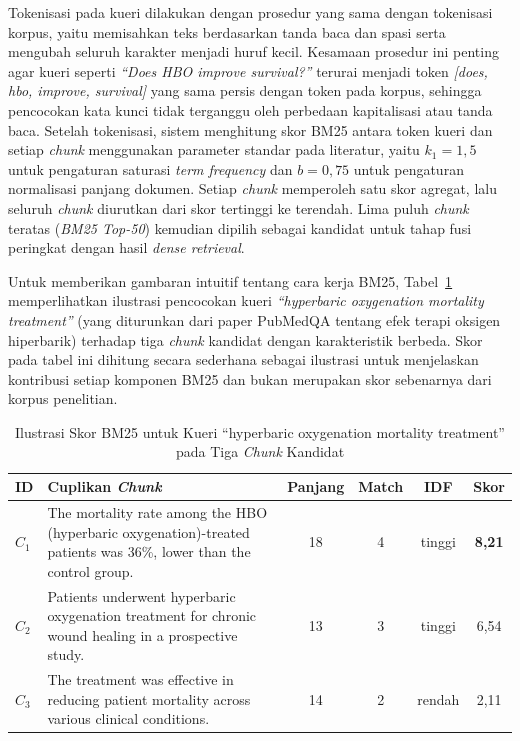 Tokenisasi pada kueri dilakukan dengan prosedur yang sama dengan tokenisasi korpus, yaitu memisahkan teks berdasarkan tanda baca dan spasi serta mengubah seluruh karakter menjadi huruf kecil. Kesamaan prosedur ini penting agar kueri seperti \textit{``Does HBO improve survival?''} terurai menjadi token \textit{[does, hbo, improve, survival]} yang sama persis dengan token pada korpus, sehingga pencocokan kata kunci tidak terganggu oleh perbedaan kapitalisasi atau tanda baca. Setelah tokenisasi, sistem menghitung skor BM25 antara token kueri dan setiap \textit{chunk} menggunakan parameter standar pada literatur, yaitu $k_1 = 1{,}5$ untuk pengaturan saturasi \textit{term frequency} dan $b = 0{,}75$ untuk pengaturan normalisasi panjang dokumen. Setiap \textit{chunk} memperoleh satu skor agregat, lalu seluruh \textit{chunk} diurutkan dari skor tertinggi ke terendah. Lima puluh \textit{chunk} teratas (\textit{BM25 Top-50}) kemudian dipilih sebagai kandidat untuk tahap fusi peringkat dengan hasil \textit{dense retrieval}.

Untuk memberikan gambaran intuitif tentang cara kerja BM25, Tabel~\ref{tbl:bm25-contoh} memperlihatkan ilustrasi pencocokan kueri \textit{``hyperbaric oxygenation mortality treatment''} (yang diturunkan dari paper PubMedQA tentang efek terapi oksigen hiperbarik) terhadap tiga \textit{chunk} kandidat dengan karakteristik berbeda. Skor pada tabel ini dihitung secara sederhana sebagai ilustrasi untuk menjelaskan kontribusi setiap komponen BM25 dan bukan merupakan skor sebenarnya dari korpus penelitian.

\begin{table}[H]
\centering
\footnotesize
\setlength{\tabcolsep}{4pt}
\caption{Ilustrasi Skor BM25 untuk Kueri ``hyperbaric oxygenation mortality treatment'' pada Tiga \textit{Chunk} Kandidat}
\label{tbl:bm25-contoh}
\begin{tabular}{p{0.7cm} p{5.6cm} cccc}
\toprule
\textbf{ID} & \textbf{Cuplikan \textit{Chunk}} & \textbf{Panjang} & \textbf{Match} & \textbf{IDF} & \textbf{Skor} \\
\midrule
$C_1$ & The mortality rate among the HBO (hyperbaric oxygenation)-treated patients was 36\%, lower than the control group. & 18 & 4 & tinggi & \textbf{8{,}21} \\
\addlinespace
$C_2$ & Patients underwent hyperbaric oxygenation treatment for chronic wound healing in a prospective study. & 13 & 3 & tinggi & 6{,}54 \\
\addlinespace
$C_3$ & The treatment was effective in reducing patient mortality across various clinical conditions. & 14 & 2 & rendah & 2{,}11 \\
\bottomrule
\end{tabular}
\end{table}

